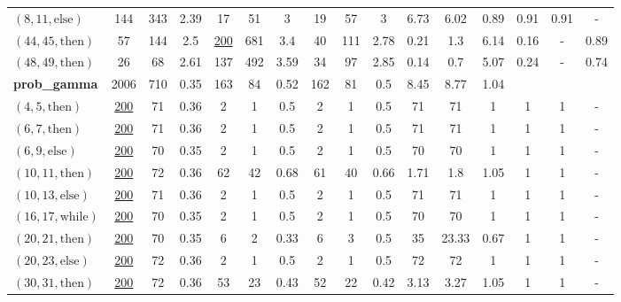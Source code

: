 \documentclass[sigconf,review,anonymous]{acmart}
\newcommand{\thenBr}{\text{then}}
\newcommand{\elseBr}{\text{else}}
\newcommand{\inWhile}{\text{while}}
\newcommand{\un}[1]{\underline{#1}}
\begin{document}
\begin{table}[!t]
\begin{tabular}{l|ccc|ccc|ccc|ccc|ccc}
    $(8,11,\elseBr)$         & 144      & 343  & 2.39      & 17   & 51   & 3            & 19  & 57  & 3                & 6.73   & 6.02  & 0.89   & 0.91 & 0.91 &  - \\
    $(44,45,\thenBr)$        & 57       & 144  & 2.5       & \un{200} & 681  & 3.4      & 40  & 111 & 2.78             & 0.21   & 1.3   & 6.14   & 0.16 & - &  0.89 \\
    $(48,49,\thenBr)$        & 26       & 68   & 2.61      & 137  & 492  & 3.59         & 34  & 97  & 2.85             & 0.14   & 0.7   & 5.07   & 0.24 & - &  0.74 \\
    \hline
    \textbf{prob\_gamma}     & 2006     & 710  & 0.35      & 163 & 84   & 0.52          & 162 & 81  & 0.5              & 8.45   & 8.77  & 1.04   &  &   &        \\
    $(4,5,\thenBr)$          & \un{200} & 71   & 0.36      & 2   & 1    & 0.5           & 2   & 1   & 0.5              & 71     & 71    & 1      & 1 & 1 &  -  \\
    $(6,7,\thenBr)$          & \un{200} & 71   & 0.36      & 2   & 1    & 0.5           & 2   & 1   & 0.5              & 71     & 71    & 1      & 1 & 1 &  -  \\
    $(6,9,\elseBr)$          & \un{200} & 70   & 0.35      & 2   & 1    & 0.5           & 2   & 1   & 0.5              & 70     & 70    & 1      & 1 & 1 &  -  \\
    $(10,11,\thenBr)$        & \un{200} & 72   & 0.36      & 62  & 42   & 0.68          & 61  & 40  & 0.66             & 1.71   & 1.8   & 1.05   & 1 & 1 &  -  \\
    $(10,13,\elseBr)$        & \un{200} & 71   & 0.36      & 2   & 1    & 0.5           & 2   & 1   & 0.5              & 71     & 71    & 1      & 1 & 1 &  -  \\
    $(16,17,\inWhile)$       & \un{200} & 70   & 0.35      & 2   & 1    & 0.5           & 2   & 1   & 0.5              & 70     & 70    & 1      & 1 & 1 &  -  \\
    $(20,21,\thenBr)$        & \un{200} & 70   & 0.35      & 6   & 2    & 0.33          & 6   & 3   & 0.5              & 35     & 23.33 & 0.67   & 1 & 1 &  -  \\
    $(20,23,\elseBr)$        & \un{200} & 72   & 0.36      & 2   & 1    & 0.5           & 2   & 1   & 0.5              & 72     & 72    & 1      & 1 & 1 &  -  \\
    $(30,31,\thenBr)$        & \un{200} & 72   & 0.36      & 53  & 23   & 0.43          & 52  & 22  & 0.42             & 3.13   & 3.27  & 1.05   & 1 & 1 &  -  \\

\end{tabular}
\end{table}
\end{document}
